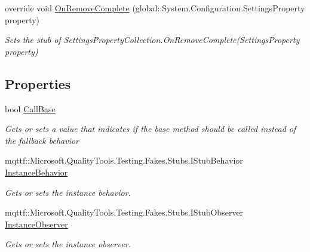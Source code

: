 \begin{DoxyCompactItemize}
override void \hyperlink{class_system_1_1_configuration_1_1_fakes_1_1_stub_settings_property_collection_adb3196b2169f54af63cd1c76d838a50d}{On\-Remove\-Complete} (global\-::\-System.\-Configuration.\-Settings\-Property property)
\begin{DoxyCompactList}\small\item\em Sets the stub of Settings\-Property\-Collection.\-On\-Remove\-Complete(\-Settings\-Property property)\end{DoxyCompactList}\end{DoxyCompactItemize}
\subsection*{Properties}
\begin{DoxyCompactItemize}
\item 
bool \hyperlink{class_system_1_1_configuration_1_1_fakes_1_1_stub_settings_property_collection_a43f23ec879172865990eb6c5e7103f2b}{Call\-Base}
\begin{DoxyCompactList}\small\item\em Gets or sets a value that indicates if the base method should be called instead of the fallback behavior\end{DoxyCompactList}\item 
mqttf\-::\-Microsoft.\-Quality\-Tools.\-Testing.\-Fakes.\-Stubs.\-I\-Stub\-Behavior \hyperlink{class_system_1_1_configuration_1_1_fakes_1_1_stub_settings_property_collection_a91fbbe75db27b3a996ef3369e6af68f6}{Instance\-Behavior}
\begin{DoxyCompactList}\small\item\em Gets or sets the instance behavior.\end{DoxyCompactList}\item 
mqttf\-::\-Microsoft.\-Quality\-Tools.\-Testing.\-Fakes.\-Stubs.\-I\-Stub\-Observer \hyperlink{class_system_1_1_configuration_1_1_fakes_1_1_stub_settings_property_collection_acd2935941119a3f98c51476e4bc41d7b}{Instance\-Observer}
\begin{DoxyCompactList}\small\item\em Gets or sets the instance observer.\end{DoxyCompactList}\end{DoxyCompactItemize}


